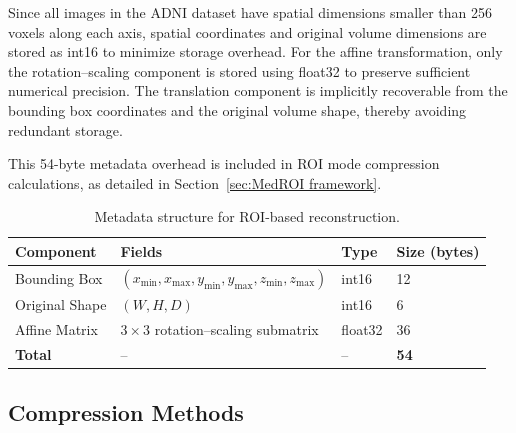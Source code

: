 \documentclass[runningheads]{llncs}
\begin{document}
Since all images in the ADNI dataset have spatial dimensions smaller than 
256 voxels along each axis, spatial coordinates and original volume dimensions 
are stored as int16 to minimize storage overhead. For the affine transformation, 
only the rotation--scaling component is stored using float32 to preserve 
sufficient numerical precision. The translation component is implicitly 
recoverable from the bounding box coordinates and the original volume shape, 
thereby avoiding redundant storage.

This 54-byte metadata overhead is included in ROI mode compression 
calculations, as detailed in Section~\ref{sec:MedROI framework}.
\begin{table}[t]
\centering
\footnotesize
\caption{Metadata structure for ROI-based reconstruction.}
\label{tab:metadata}
\begin{tabular}{llll}
\toprule
\textbf{Component} & \textbf{Fields} & \textbf{Type} & \textbf{Size (bytes)} \\
\midrule
Bounding Box & 
$\left(x_{\min}, x_{\max}, y_{\min}, y_{\max}, z_{\min}, z_{\max}\right)$ &
int16 & 12 \\

Original Shape & 
$(W, H, D)$ &
int16 & 6 \\

Affine Matrix & 
$3 \times 3$ rotation--scaling submatrix &
float32 & 36 \\
\midrule
\textbf{Total} & -- & -- & \textbf{54} \\
\bottomrule
\end{tabular}
\end{table}

\subsection{Compression Methods}
\end{document}
